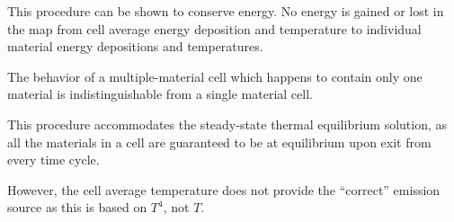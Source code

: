 \documentclass[12pt]{article}
\begin{document}
This procedure can be shown to conserve energy. No energy is gained or
lost in the map from cell average energy deposition and temperature to
individual material energy depositions and temperatures.

The behavior of a multiple-material cell which happens to contain
only  one material is indistinguishable from a single material cell.

This procedure  accommodates the steady-state thermal equilibrium
solution, as all the materials in a cell are guaranteed to be at
equilibrium upon exit from every time cycle.

However, the cell average temperature does not provide the ``correct''
emission source as this is based on $T^4$, not $T$.

\nocite{MihalasMihalas}


\end{document}
